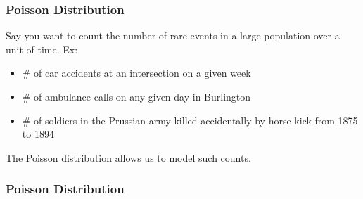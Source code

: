 \documentclass[handout]{beamer}
\newcommand{\blue}[1]{\textcolor{blue2}{#1}}
\begin{document}
\begin{frame}
\frametitle{Poisson Distribution}

Say you want to count the number of rare events in a large population over a unit of time.  Ex:
\begin{itemize}
\pause \item \# of car accidents at an intersection on a given week
\pause \item \# of ambulance calls on any given day in Burlington
\pause \item \# of soldiers in the Prussian army killed accidentally by horse kick from 1875 to 1894
\end{itemize}

\vskip 0.25cm

\pause The \blue{Poisson distribution} allows us to model such counts.

\end{frame}


\begin{frame}
\frametitle{Poisson Distribution}
%
%
%
%

\end{frame}


%
%
%
\end{document}
